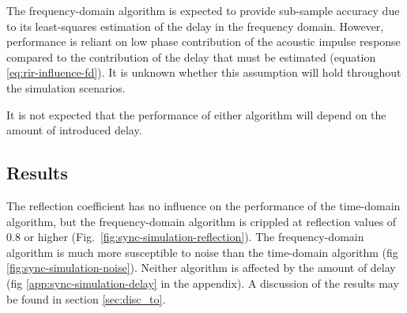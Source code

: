 \documentclass[a4paper, notitlepage]{report}
\begin{document}
The frequency-domain algorithm is expected to provide sub-sample accuracy due to its least-squares estimation of the delay in the frequency domain. However, performance is reliant on low phase contribution of the acoustic impulse response compared to the contribution of the delay that must be estimated (equation \ref{eq:rir-influence-fd}). It is unknown whether this assumption will hold throughout the simulation scenarios.

It is not expected that the performance of either algorithm will depend on the amount of introduced delay.

\subsection{Results}
The reflection coefficient has no influence on the performance of the time-domain algorithm, but the frequency-domain algorithm is crippled at reflection values of $0.8$ or higher (Fig.~\ref{fig:sync-simulation-reflection}). The frequency-domain algorithm is much more susceptible to noise than the time-domain algorithm (fig \ref{fig:sync-simulation-noise}). Neither algorithm is affected by the amount of delay (fig \ref{app:sync-simulation-delay} in the appendix). A discussion of the results may be found in section \ref{sec:disc_to}.
\end{document}
